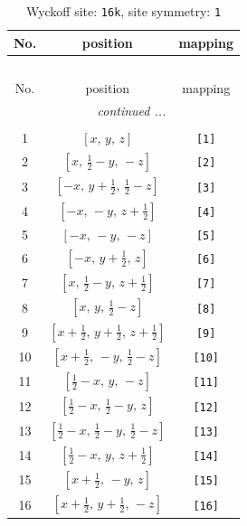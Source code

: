 \documentclass[fleqn,8pt]{jsarticle}
\begin{document}
\begin{longtable}{ccc}
\caption{Wyckoff site: {\tt 16k}, site symmetry: {\tt 1}}
 \\
 \hline \hline
No. & position & mapping \\ \hline \endfirsthead

\multicolumn{2}{l}{\tablename\ \thetable{}} \\
 \hline \hline
No. & position & mapping \\ \hline \endhead

 \hline \hline
\multicolumn{2}{r}{\footnotesize\it continued ...} \\ \endfoot

 \hline \hline
\multicolumn{2}{r}{} \\ \endlastfoot

1 & $\left[ x,\, y,\, z \right]$ & {\tt [1]} \\ \hline
2 & $\left[ x,\, \frac{1}{2} - y,\, - z \right]$ & {\tt [2]} \\ \hline
3 & $\left[ - x,\, y + \frac{1}{2},\, \frac{1}{2} - z \right]$ & {\tt [3]} \\ \hline
4 & $\left[ - x,\, - y,\, z + \frac{1}{2} \right]$ & {\tt [4]} \\ \hline
5 & $\left[ - x,\, - y,\, - z \right]$ & {\tt [5]} \\ \hline
6 & $\left[ - x,\, y + \frac{1}{2},\, z \right]$ & {\tt [6]} \\ \hline
7 & $\left[ x,\, \frac{1}{2} - y,\, z + \frac{1}{2} \right]$ & {\tt [7]} \\ \hline
8 & $\left[ x,\, y,\, \frac{1}{2} - z \right]$ & {\tt [8]} \\ \hline
9 & $\left[ x + \frac{1}{2},\, y + \frac{1}{2},\, z + \frac{1}{2} \right]$ & {\tt [9]} \\ \hline
10 & $\left[ x + \frac{1}{2},\, - y,\, \frac{1}{2} - z \right]$ & {\tt [10]} \\ \hline
11 & $\left[ \frac{1}{2} - x,\, y,\, - z \right]$ & {\tt [11]} \\ \hline
12 & $\left[ \frac{1}{2} - x,\, \frac{1}{2} - y,\, z \right]$ & {\tt [12]} \\ \hline
13 & $\left[ \frac{1}{2} - x,\, \frac{1}{2} - y,\, \frac{1}{2} - z \right]$ & {\tt [13]} \\ \hline
14 & $\left[ \frac{1}{2} - x,\, y,\, z + \frac{1}{2} \right]$ & {\tt [14]} \\ \hline
15 & $\left[ x + \frac{1}{2},\, - y,\, z \right]$ & {\tt [15]} \\ \hline
16 & $\left[ x + \frac{1}{2},\, y + \frac{1}{2},\, - z \right]$ & {\tt [16]} \\
\end{longtable}
\end{document}
